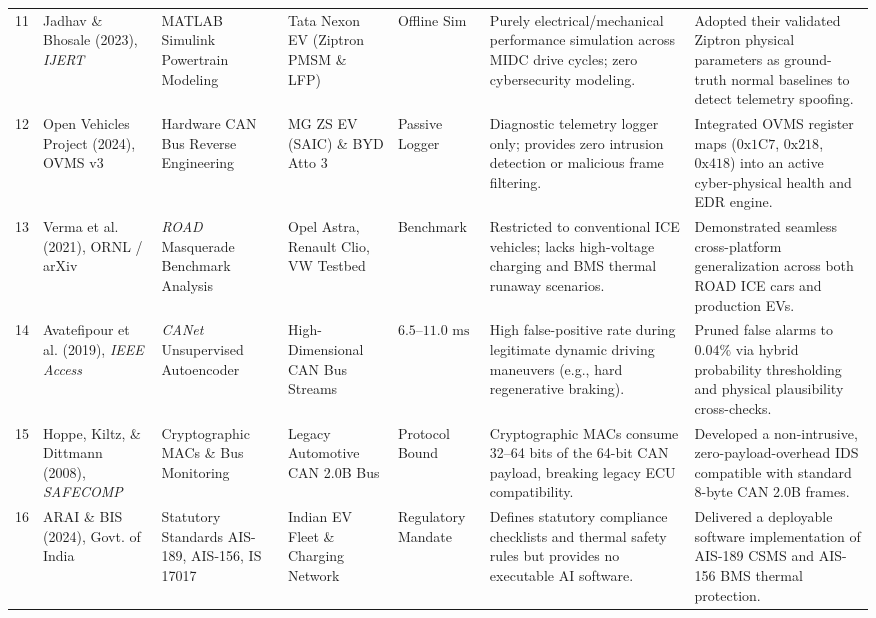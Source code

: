 \documentclass[conference]{IEEEtran}
\begin{document}
\begin{table}[!t]
{\begin{tabular}{p{0.3cm} p{2.8cm} p{2.3cm} p{2.2cm} p{1.1cm} p{4.2cm} p{4.5cm}}
11 & Jadhav \& Bhosale (2023), \textit{IJERT} \cite{jadhav2023} & MATLAB Simulink Powertrain Modeling & Tata Nexon EV (Ziptron PMSM \& LFP) & Offline Sim & Purely electrical/mechanical performance simulation across MIDC drive cycles; zero cybersecurity modeling. & Adopted their validated Ziptron physical parameters as ground-truth normal baselines to detect telemetry spoofing. \\
12 & Open Vehicles Project (2024), OVMS v3 \cite{ovms2024} & Hardware CAN Bus Reverse Engineering & MG ZS EV (SAIC) \& BYD Atto 3 & Passive Logger & Diagnostic telemetry logger only; provides zero intrusion detection or malicious frame filtering. & Integrated OVMS register maps ($0\text{x}1\text{C}7$, $0\text{x}218$, $0\text{x}418$) into an active cyber-physical health and EDR engine. \\
13 & Verma et al. (2021), ORNL / arXiv \cite{verma2021} & \textit{ROAD} Masquerade Benchmark Analysis & Opel Astra, Renault Clio, VW Testbed & Benchmark & Restricted to conventional ICE vehicles; lacks high-voltage charging and BMS thermal runaway scenarios. & Demonstrated seamless cross-platform generalization across both ROAD ICE cars and production EVs. \\
14 & Avatefipour et al. (2019), \textit{IEEE Access} \cite{avatefipour2019} & \textit{CANet} Unsupervised Autoencoder & High-Dimensional CAN Bus Streams & $6.5\text{--}11.0\text{ ms}$ & High false-positive rate during legitimate dynamic driving maneuvers (e.g., hard regenerative braking). & Pruned false alarms to $0.04\%$ via hybrid probability thresholding and physical plausibility cross-checks. \\
15 & Hoppe, Kiltz, \& Dittmann (2008), \textit{SAFECOMP} \cite{hoppe2008} & Cryptographic MACs \& Bus Monitoring & Legacy Automotive CAN 2.0B Bus & Protocol Bound & Cryptographic MACs consume 32--64 bits of the 64-bit CAN payload, breaking legacy ECU compatibility. & Developed a non-intrusive, zero-payload-overhead IDS compatible with standard 8-byte CAN 2.0B frames. \\
16 & ARAI \& BIS (2024), Govt. of India \cite{arai2024} & Statutory Standards AIS-189, AIS-156, IS 17017 & Indian EV Fleet \& Charging Network & Regulatory Mandate & Defines statutory compliance checklists and thermal safety rules but provides no executable AI software. & Delivered a deployable software implementation of AIS-189 CSMS and AIS-156 BMS thermal protection. \\
\bottomrule
\end{tabular}%
}
\end{table}
\end{document}
